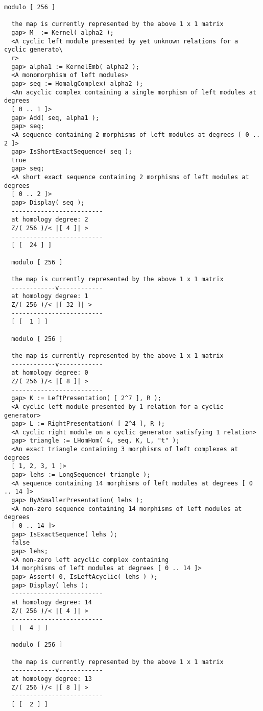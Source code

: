 \documentclass[a4paper,11pt]{report}
\begin{document}
{{{\begin{Verbatim}[fontsize=\small,frame=single,label=Example]
  modulo [ 256 ]
  
  the map is currently represented by the above 1 x 1 matrix
  gap> M_ := Kernel( alpha2 );
  <A cyclic left module presented by yet unknown relations for a cyclic generato\
  r>
  gap> alpha1 := KernelEmb( alpha2 );
  <A monomorphism of left modules>
  gap> seq := HomalgComplex( alpha2 );
  <An acyclic complex containing a single morphism of left modules at degrees 
  [ 0 .. 1 ]>
  gap> Add( seq, alpha1 );
  gap> seq;
  <A sequence containing 2 morphisms of left modules at degrees [ 0 .. 2 ]>
  gap> IsShortExactSequence( seq );
  true
  gap> seq;
  <A short exact sequence containing 2 morphisms of left modules at degrees 
  [ 0 .. 2 ]>
  gap> Display( seq );
  -------------------------
  at homology degree: 2
  Z/( 256 )/< |[ 4 ]| > 
  -------------------------
  [ [  24 ] ]
  
  modulo [ 256 ]
  
  the map is currently represented by the above 1 x 1 matrix
  ------------v------------
  at homology degree: 1
  Z/( 256 )/< |[ 32 ]| > 
  -------------------------
  [ [  1 ] ]
  
  modulo [ 256 ]
  
  the map is currently represented by the above 1 x 1 matrix
  ------------v------------
  at homology degree: 0
  Z/( 256 )/< |[ 8 ]| > 
  -------------------------
  gap> K := LeftPresentation( [ 2^7 ], R );
  <A cyclic left module presented by 1 relation for a cyclic generator>
  gap> L := RightPresentation( [ 2^4 ], R );
  <A cyclic right module on a cyclic generator satisfying 1 relation>
  gap> triangle := LHomHom( 4, seq, K, L, "t" );
  <An exact triangle containing 3 morphisms of left complexes at degrees 
  [ 1, 2, 3, 1 ]>
  gap> lehs := LongSequence( triangle );
  <A sequence containing 14 morphisms of left modules at degrees [ 0 .. 14 ]>
  gap> ByASmallerPresentation( lehs );
  <A non-zero sequence containing 14 morphisms of left modules at degrees 
  [ 0 .. 14 ]>
  gap> IsExactSequence( lehs );
  false
  gap> lehs;
  <A non-zero left acyclic complex containing 
  14 morphisms of left modules at degrees [ 0 .. 14 ]>
  gap> Assert( 0, IsLeftAcyclic( lehs ) );
  gap> Display( lehs );
  -------------------------
  at homology degree: 14
  Z/( 256 )/< |[ 4 ]| > 
  -------------------------
  [ [  4 ] ]
  
  modulo [ 256 ]
  
  the map is currently represented by the above 1 x 1 matrix
  ------------v------------
  at homology degree: 13
  Z/( 256 )/< |[ 8 ]| > 
  -------------------------
  [ [  2 ] ]
  

\end{Verbatim}}}}
\end{document}
